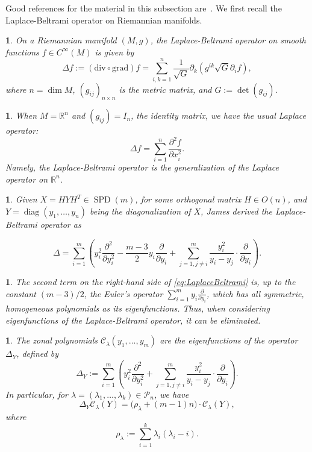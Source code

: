 \documentclass[smallextended]{svjour3}
\newtheorem{defn}[thm]{\protect\definitionname}
\newtheorem{rem}[thm]{\protect\remarkname}
\newtheorem{prop}[thm]{\protect\propositionname}
\DeclareMathOperator{\diag}{diag}
\newcommand{\SPD}{\operatorname{SPD}}
\providecommand{\definitionname}{Definition}
\providecommand{\propositionname}{Proposition}
\providecommand{\remarkname}{Remark}
\begin{document}
Good references for the material in this subsection are~\cite{Helgason,James1,Moakher}.
We first recall the Laplace-Beltrami operator on Riemannian manifolds.
\begin{defn}
On a Riemannian manifold $(M,g)$, the Laplace-Beltrami
operator on smooth functions $f\in C^{\infty}(M)$ is given by 
\[
\Delta f:=(\mathrm{div}\circ\mathrm{grad})f=\sum_{i,k=1}^{n}\frac{1}{\sqrt{G}}\partial_{k}\left(g^{ik}\sqrt{G}\partial_{i}f\right),
\]
where $n=\dim M$, $(g_{ij})_{n\times n}$ is the metric
matrix, and $G:=\det(g_{ij})$. 
\end{defn}
\begin{rem}
When $M=\mathbb{R}^{n}$ and $(g_{ij})=I_{n}$, the identity
matrix, we have the usual Laplace operator:
\[
\Delta f=\sum_{i=1}^{n}\frac{\partial^{2}f}{\partial x_{i}^{2}}.
\]
Namely, the Laplace-Beltrami operator is the generalization of the Laplace
operator on $\mathbb{R}^{n}$. 
\end{rem}
\begin{prop}
Given $X\!\!=\!\!HY\!H^T\!\!\!\in\!\!\SPD(m)$, for some orthogonal matrix $H\!\!\!\in\!\!O(n)$, and $Y\!\!=\!\diag(y_{1},\ldots,y_{n})$ being the diagonalization of $X$, James \cite[eq.~3.12]{James1} derived the Laplace-Beltrami operator as

\begin{equation}
\Delta=\sum_{i=1}^{m}\left(y_{i}^{2}\frac{\partial^{2}}{\partial y_{i}^{2}}-\frac{m-3}{2}y_{i}\frac{\partial}{\partial y_{i}}+\sum_{j=1,j\neq i}^{m}\frac{y_{i}^{2}}{y_{i}-y_{j}}\cdot\frac{\partial}{\partial y_{i}}\right). \label{eq:LaplaceBeltrami}
\end{equation}
\end{prop}
\begin{rem}
The second term on the right-hand side of \eqref{eq:LaplaceBeltrami} is, up to the constant $(m-3)/2$,
the Euler's operator $\sum_{i=1}^{m}y_{i}\frac{\partial}{\partial y_{i}}$,
which has all symmetric, homogeneous polynomials as its eigenfunctions.
Thus, when considering eigenfunctions of the Laplace-Beltrami operator,
it can be eliminated.
\end{rem}
\begin{defn}
The zonal polynomials $\mathcal{C}_{\lambda}(y_{1},\ldots,y_{m})$
are the eigenfunctions of the operator $\Delta_{Y}$, defined by
\[
  \Delta_{Y}:=\sum_{i=1}^{m}\left(y_{i}^{2}\frac{\partial^{2}}{\partial y_{i}^{2}}+\sum_{j=1,j\neq i}^{m}\frac{y_{i}^{2}}{y_{i}-y_{j}}\cdot\frac{\partial}{\partial y_{i}}\right).
\]
In particular,  for $\lambda=(\lambda_1,\ldots,\lambda_k)\in\mathcal{P}_n$, we have
\[
  \Delta_{Y}\mathcal{C}_{\lambda}(Y)=\bigl(\rho_{\lambda}+(m-1)n\bigr)\cdot\mathcal{C}_{\lambda}(Y),
\]
where
\begin{equation}\label{eq:RHO}
  \rho_{\lambda}:=\sum_{i=1}^{k}\lambda_{i}\left(\lambda_{i}-i\right).
\end{equation}
\end{defn}
\end{document}
